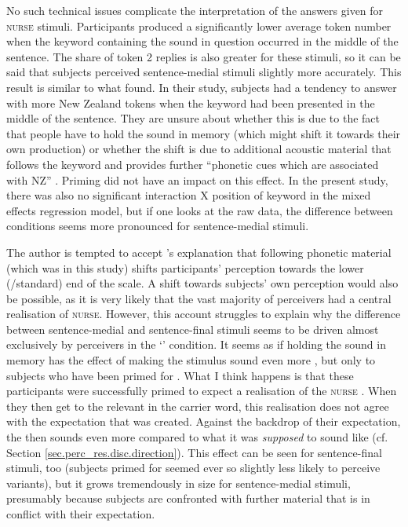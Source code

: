 No such technical issues complicate the interpretation of the answers given for \textsc{nurse} stimuli.
Participants produced a significantly lower average token number when the keyword containing the sound in question occurred in the middle of the sentence.
The share of token 2 replies is also greater for these stimuli, so it can be said that subjects perceived sentence-medial stimuli slightly more accurately.
This result is similar to what \textcite{hayetal2006a} found.
In their study, subjects had a tendency to answer with more New Zealand tokens when the keyword had been presented in the middle of the sentence.
They are unsure about whether this is due to the fact that people have to hold the sound in memory (which might shift it towards their own production) or whether the shift is due to additional acoustic material that follows the keyword and provides further ``phonetic cues which are associated with NZ'' \parencite[365]{hayetal2006a}.
Priming did not have an impact on this effect.
In the present study, there was also no significant interaction  X position of keyword in the mixed effects regression model, but if one looks at the raw data, the difference between  conditions seems more pronounced for sentence-medial stimuli.

The author is tempted to accept \textcite{hayetal2006a}'s explanation that following phonetic material (which was  in this study) shifts participants' perception towards the lower (/standard) end of the scale.
A shift towards subjects' own perception would also be possible, as it is very likely that the vast majority of perceivers had a central realisation of \textsc{nurse}.
However, this account struggles to explain why the difference between sentence-medial and sentence-final stimuli seems to be driven almost exclusively by perceivers in the `' condition.
It seems as if holding the sound in memory has the effect of making the stimulus sound even more , but only to subjects who have been primed for .
What I think happens is that these participants were successfully primed to expect a  realisation of the \textsc{nurse} .
When they then get to the relevant  in the carrier word, this realisation does not agree with the expectation that was created.
Against the backdrop of their expectation, the  then sounds even more  compared to what it was \emph{supposed} to sound like (cf. Section \ref{sec.perc_res.disc.direction}).
This effect can be seen for sentence-final stimuli, too (subjects primed for  seemed ever so slightly less likely to perceive  variants), but it grows tremendously in size for sentence-medial stimuli, presumably because subjects are confronted with further material that is in conflict with their expectation.

